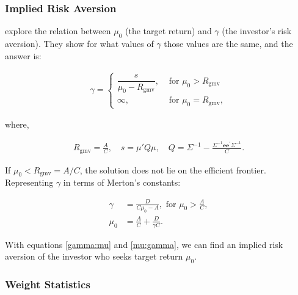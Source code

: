 \documentclass[12pt,oneside,a4paper]{memoir}
\begin{document}
\subsubsection*{Implied Risk Aversion}

 explore the relation between $\mu_{0}$ (the target return) and $\gamma$ (the investor's risk aversion). 
They show for what values of $\gamma$ those values are the same, and the answer is:

\vspace{-18 pt}
\begin{align*} \label{gamma:bodnar}
\gamma = 
	\begin{cases}
		\dfrac{s}{\mu_0 - R_{\mathrm{gmv}}}, &\text{ for } \mu_0 > R_{\mathrm{gmv}}
		\\
		\infty, & \text{ for } \mu_0 = R_{\mathrm{gmv}},
	\end{cases}
\end{align*}

\noindent
where,

\vspace{-18 pt}
\begin{align*}
R_{\mathrm{gmv}} =
\frac{A}{C}, \quad s = \mu'Q\mu, \quad Q = \Sigma^{-1} - \frac{\Sigma^{-1} \mathbf{e} \mathbf{e}^{\prime}\Sigma^{-1}}{C}.
\end{align*}
 
\noindent If $\mu_0 <  R_{\mathrm{gmv}}=A/C$, the solution does not lie on the efficient frontier.
Representing $\gamma$ in terms of Merton's constants:

\vspace{-18 pt}
\begin{align}
\label{gamma:mu}
\gamma &= \frac{D}{C \mu_0 - A}, \text{ for }   \mu_0 >\frac{A}{C},
\\
\label{mu:gamma}
\mu_0 &= \frac{A}{C} + \frac{D}{\gamma C}.
\end{align}

\noindent
With equations \eqref{gamma:mu} and \eqref{mu:gamma}, we can find an implied risk aversion of the investor who seeks target return $\mu_{0}$.

\subsubsection*{Weight Statistics}
\end{document}
